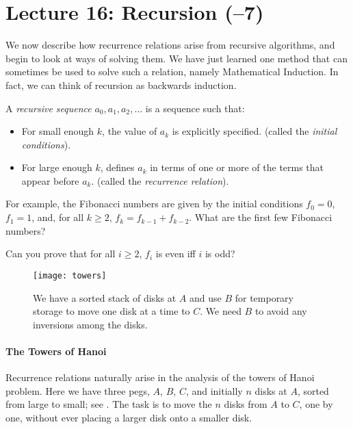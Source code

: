 \section*{Lecture 16: Recursion (--7)}

We now describe how recurrence relations arise from recursive algorithms,
and begin to look at ways of solving them.
We have just learned one method that can sometimes be used to solve
such a relation, namely Mathematical Induction.
In fact, we can think of recursion as backwards induction.

\begin{definition}
    A \emph{recursive sequence} $a_0, a_1, a_2, \ldots$ is a sequence such that:
    \begin{itemize}
        \item For small enough $k$, the value of $a_k$ is explicitly specified.
            (called the \emph{initial conditions}).
        \item For large enough $k$, defines $a_k$ in terms of one or more of the
            terms that appear before $a_k$. (called the \emph{recurrence
            relation}).
    \end{itemize}
\end{definition}

For example, the Fibonacci numbers are given by the initial conditions $f_0=0$,
$f_1=1$, and, for all $k \geq 2$, $f_k=f_{k-1}+f_{k-2}$.  What are the first few
Fibonacci numbers?
\practice

Can you prove that for
all $i \geq 2$, $f_i$ is even iff $i$ is odd?

\begin{figure}[tbh]
    \centering
    \texttt{[image: towers]}
    \caption{We have a sorted stack of disks at $A$ and use $B$ for temporary
    storage to move one disk at a time to $C$.
    We need $B$ to avoid any inversions among the disks.}
    \label{fig:towers}
\end{figure}
\paragraph{The Towers of Hanoi}
Recurrence relations naturally arise in the analysis of
the towers of Hanoi problem.
Here we have three pegs, $A$, $B$, $C$, and initially $n$
disks at $A$, sorted from large to small;
see .
The task is to move the $n$ disks from $A$ to $C$, one by one,
without ever placing a larger disk onto a smaller disk.

